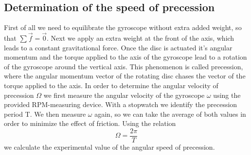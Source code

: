 \documentclass{scrartcl}
\begin{document}
\subsection{Determination of the speed of precession}
 First of all we need to equilibrate the gyroscope without extra added weight, so that $\sum \vec{f} = \vec{0}$.
 Next we apply an extra weight at the front of the axis, which leads to a constant gravitational force. Once the disc is actuated it's angular momentum and the torque applied to the axis of the gyroscope lead to a rotation of the gyroscope around the vertical axis. This phenomenon is called precession, where the angular momentum vector of the rotating disc chases the vector of the torque applied to the axis.
 In order to determine the angular velocity of precession $\Omega$ we first measure the angular velocity of the gyroscope $\omega$ using the provided RPM-measuring device. With a stopwatch we identify the precession period T. We then measure $\omega$ again, so we can take the average of both values in order to minimize the effect of friction. Using the relation 
 \begin{equation}
     \Omega = \frac{2\pi}{T}
 \end{equation}
 we calculate the experimental value of the angular speed of precession.
 
\end{document}
